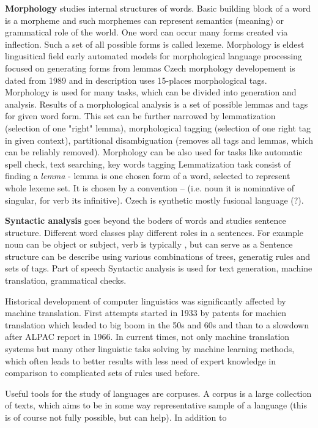 \textbf{Morphology} studies internal structures of words. Basic building block of a word is a morpheme and such morphemes can represent semantics (meaning) or grammatical role of the world. %
One word can occur many forms created via inflection. %
Such a set of all possible forms is called lexeme. Morphology is eldest lingusitical field %
early automated models for morphological language processing focused on generating forms from lemmas %
Czech morphology developement is dated from 1989 %
and in description uses 15-places morphological tags. %
Morphology is used for many tasks, which can be divided into generation and analysis. Results of a morphological analysis is a set of possible lemmas and tags for given word form. This set can be further narrowed by lemmatization (selection of one "right" lemma), morphological tagging (selection of one right tag in given context), partitional disambiguation (removes all tags and lemmas, which can be reliably removed). Morphology can be also used for tasks like automatic spell check, text searching, key words tagging %
Lemmatization task consist of finding a \textit{lemma} - lemma is one chosen form of a word, selected to represent whole lexeme set. It is chosen by a convention -- (i.e. noun it is nominative of singular, for verb its infinitive). Czech is synthetic mostly fusional language (?).

\textbf{Syntactic analysis} goes beyond the boders of words and studies sentence structure. %
Different word classes play different roles in a sentences. For example noun can be object %
or subject, verb is typically %
, but can serve as a %
Sentence structure can be describe using various combinations of trees, generatig rules and sets of tags. %
Part of speech %
Syntactic analysis is used for text generation, machine translation, grammatical checks. %

Historical development of computer linguistics was significantly affected by machine translation. First attempts started in 1933 by patents for machien translation %
which leaded to big boom in the 50s and 60s and than to a slowdown after ALPAC report in 1966. %
In current times, not only machine translation systems but many other linguistic taks solving by machine learning methods, which often leads to better results with less need of expert knowledge in comparison to complicated sets of rules used before. %
\par
Useful tools for the study of languages are corpuses. A corpus is a large collection of texts, which aims to be in some way representative sample of a language (this is of course not fully possible, but can help). In addition to 

